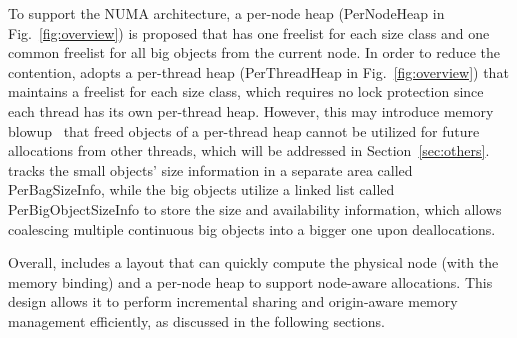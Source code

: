To support the NUMA architecture, a per-node heap (PerNodeHeap in Fig.~\ref{fig:overview}) is proposed that has one freelist for each size class and one common freelist for all big objects from the current node. 
In order to reduce the contention, \NM{} adopts a per-thread heap (PerThreadHeap in Fig.~\ref{fig:overview}) that maintains a freelist for each size class, which requires no lock protection since each thread has its own per-thread heap. However, this may introduce memory blowup~\cite{Hoard} that freed objects of a per-thread heap cannot be utilized for future allocations from other threads, which will be addressed in Section~\ref{sec:others}. 
\NM{} tracks the small objects' size information in a separate area called PerBagSizeInfo, while the big objects utilize a linked list called PerBigObjectSizeInfo to store the size and availability information, which allows coalescing multiple continuous big objects into a bigger one upon deallocations.



Overall, \NM{} includes a layout that can quickly compute the physical node (with the memory binding) and a per-node heap to support node-aware allocations. This design allows it to perform incremental sharing and origin-aware memory management efficiently, as discussed in the following sections.

